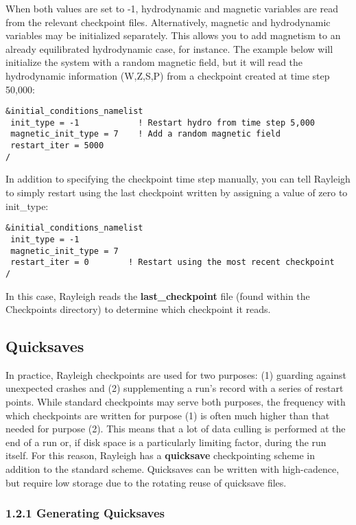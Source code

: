 When both values are set to -1, hydrodynamic and magnetic variables are read from the relevant checkpoint files.  Alternatively, magnetic and hydrodynamic variables may be initialized separately.  This allows you to add magnetism to an already equilibrated hydrodynamic case, for instance.  The example below will initialize the system with a random magnetic field, but it will read the hydrodynamic information (W,Z,S,P) from a checkpoint created at time step 50,000:
\begin{lstlisting}
&initial_conditions_namelist
 init_type = -1            ! Restart hydro from time step 5,000
 magnetic_init_type = 7    ! Add a random magnetic field
 restart_iter = 5000
/
\end{lstlisting}
In addition to specifying the checkpoint time step manually, you can tell Rayleigh to simply restart using the last checkpoint written by assigning a value of zero to init\_type:

\begin{lstlisting}
&initial_conditions_namelist
 init_type = -1
 magnetic_init_type = 7
 restart_iter = 0        ! Restart using the most recent checkpoint
/
\end{lstlisting}

In this case, Rayleigh reads the \textbf{last\_checkpoint} file (found within the Checkpoints directory) to determine which checkpoint it reads.


\subsection{Quicksaves}\label{sec:quicksaves}
In practice, Rayleigh checkpoints are used for two purposes:  (1) guarding against unexpected crashes and (2) supplementing a run's record with a series of restart points.  While standard checkpoints may serve both purposes, the frequency with which checkpoints are written for purpose (1) is often much higher than that needed for purpose (2).  This means that a lot of data culling is performed at the end of a run or, if disk space is a particularly limiting factor, during the run itself.  For this reason, Rayleigh has a \textbf{quicksave} checkpointing scheme in addition to the standard scheme.  Quicksaves can be written with high-cadence, but require low storage due to the rotating reuse of quicksave files.

\subsubsection{1.2.1 Generating Quicksaves}


